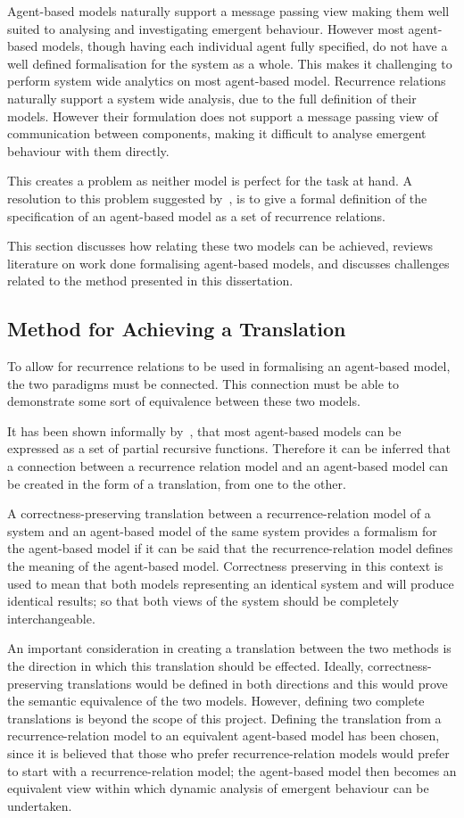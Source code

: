 \documentclass{article}
\begin{document}
Agent-based models naturally support a message passing view making them well suited to analysing and investigating emergent behaviour. However most agent-based models, though having each individual agent fully specified, do not have a well defined formalisation for the system as a whole. This makes it challenging to perform system wide analytics on most agent-based model. Recurrence relations naturally support a system wide analysis, due to the full definition of their models. However their formulation does not support a message passing view of communication between components, making it difficult to analyse emergent behaviour with them directly. 

This creates a problem as neither model is perfect for the task at hand. A resolution to this problem suggested by~\cite{econmistsnoabm}, is to give a formal definition of the specification of an agent-based model as a set of recurrence relations. 

This section discusses how relating these two models can be achieved, reviews literature on work done formalising agent-based models, and discusses challenges related to the method presented in this dissertation.  


\subsection{Method for Achieving a Translation}
To allow for recurrence relations to be used in formalising an agent-based model, the two paradigms must be connected. This connection must be able to demonstrate some sort of equivalence between these two models. 

It has been shown informally by~\cite{gabm3}, that most agent-based models can be expressed as a set of partial recursive functions. Therefore it can be inferred that a connection between a recurrence relation model and an agent-based model can be created in the form of a translation, from one to the other. 

A correctness-preserving translation between a recurrence-relation model of a system and an agent-based model of the same system provides a formalism for the agent-based model if it can be said that the recurrence-relation model defines the meaning of the agent-based model. Correctness preserving in this context is used to mean that both models representing an identical system and will produce identical results; so that both views of the system should be completely interchangeable. 

An important consideration in creating a translation between the two methods is the direction in which this translation should be effected. Ideally, correctness-preserving translations would be defined in both directions and this would prove the semantic equivalence of the two models.  However, defining two complete translations is beyond the scope of this project.  Defining the translation from a recurrence-relation model to an equivalent agent-based model has been chosen, since it is believed that those who prefer recurrence-relation models would prefer to start with a recurrence-relation model; the agent-based model then becomes an equivalent view within which dynamic analysis of emergent behaviour can be undertaken.
\end{document}
